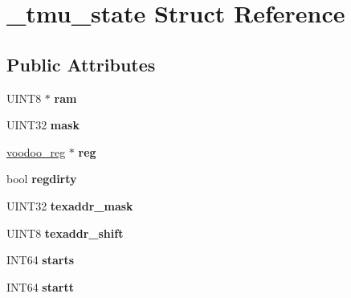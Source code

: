 \hypertarget{struct__tmu__state}{\section{\-\_\-tmu\-\_\-state Struct Reference}
\label{struct__tmu__state}
}
\subsection*{Public Attributes}
\begin{DoxyCompactItemize}
\item 
\hypertarget{struct__tmu__state_acb39e0e0f079b1c3539d0611812e2ce2}{U\-I\-N\-T8 $\ast$ {\bfseries ram}}\label{struct__tmu__state_acb39e0e0f079b1c3539d0611812e2ce2}

\item 
\hypertarget{struct__tmu__state_a157f2ec536c7f1d546eef41261f4d1b7}{U\-I\-N\-T32 {\bfseries mask}}\label{struct__tmu__state_a157f2ec536c7f1d546eef41261f4d1b7}

\item 
\hypertarget{struct__tmu__state_aed0778b097c904934273eba35a98df3d}{\hyperlink{union__voodoo__reg}{voodoo\-\_\-reg} $\ast$ {\bfseries reg}}\label{struct__tmu__state_aed0778b097c904934273eba35a98df3d}

\item 
\hypertarget{struct__tmu__state_acdb912f7aefc1f30cf2fb33b04bb7ddf}{bool {\bfseries regdirty}}\label{struct__tmu__state_acdb912f7aefc1f30cf2fb33b04bb7ddf}

\item 
\hypertarget{struct__tmu__state_a7e13a806ef4cd760684d9e7b5451e26b}{U\-I\-N\-T32 {\bfseries texaddr\-\_\-mask}}\label{struct__tmu__state_a7e13a806ef4cd760684d9e7b5451e26b}

\item 
\hypertarget{struct__tmu__state_a7d775c0987da123700f4e5db22327a79}{U\-I\-N\-T8 {\bfseries texaddr\-\_\-shift}}\label{struct__tmu__state_a7d775c0987da123700f4e5db22327a79}

\item 
\hypertarget{struct__tmu__state_afaaa7f3489dceb21b602166144768af8}{I\-N\-T64 {\bfseries starts}}\label{struct__tmu__state_afaaa7f3489dceb21b602166144768af8}

\item 
\hypertarget{struct__tmu__state_a79d2da894ef6e4491457645bedae493a}{I\-N\-T64 {\bfseries startt}}\label{struct__tmu__state_a79d2da894ef6e4491457645bedae493a}


\end{DoxyCompactItemize}
